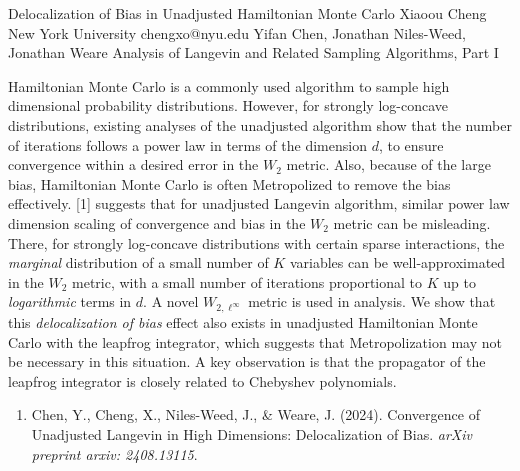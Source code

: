 \begin{talk}
  {Delocalization of Bias in Unadjusted Hamiltonian Monte Carlo}%
  {Xiaoou Cheng}%
  {New York University}%
  {chengxo@nyu.edu}%
  {Yifan Chen, Jonathan Niles-Weed, Jonathan Weare}%
  {Analysis of Langevin and Related Sampling Algorithms, Part I}%
    
   
Hamiltonian Monte Carlo is a commonly used algorithm to sample high dimensional probability distributions. However, for strongly log-concave distributions, existing analyses of the unadjusted algorithm show that the number of iterations follows a power law in terms of the dimension $d$, to ensure convergence within a desired error in the $W_2$ metric. Also, because of the large bias, Hamiltonian Monte Carlo is often Metropolized to remove the bias effectively. [1] suggests that for unadjusted Langevin algorithm, similar power law dimension scaling of convergence and bias in the $W_2$ metric can be misleading. There, for strongly log-concave distributions with certain sparse interactions, the \emph{marginal} distribution of a small number of $K$ variables can be well-approximated in the $W_2$ metric, with a small number of iterations proportional to $K$ up to \emph{logarithmic} terms in $d$. A novel $W_{2,\ell^\infty}$ metric is used in analysis. We show that this \emph{delocalization of bias} effect also exists in unadjusted Hamiltonian Monte Carlo with the leapfrog integrator, which suggests that Metropolization may not be necessary in this situation. A key observation is that the propagator of the leapfrog integrator is closely related to Chebyshev polynomials.

\medskip

\begin{enumerate}
 \item[{[1]}] Chen, Y., Cheng, X., Niles-Weed, J., \& Weare, J. (2024). Convergence of Unadjusted Langevin in High Dimensions: Delocalization of Bias. \textit{arXiv preprint arxiv: 2408.13115}.
\end{enumerate}

\end{talk}
